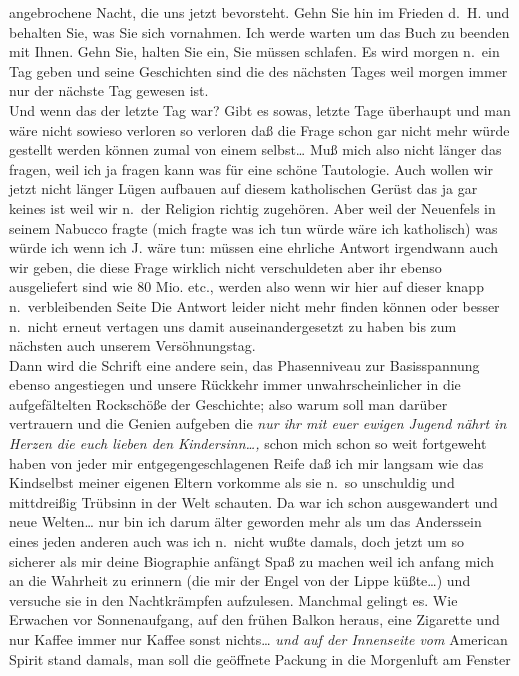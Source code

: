 \documentclass[
]{article}
\begin{document}
angebrochene Nacht, die uns jetzt bevorsteht. Gehn Sie hin im Frieden
d.~H. und behalten Sie, was Sie sich vornahmen. Ich werde warten um das
Buch zu beenden mit Ihnen. Gehn Sie, halten Sie ein, Sie müssen
schlafen. Es wird morgen n.~ein Tag geben und seine Geschichten sind die
des nächsten Tages weil morgen immer nur der nächste Tag gewesen ist.\\
Und wenn das der letzte Tag war? Gibt es sowas, letzte Tage überhaupt
und man wäre nicht sowieso verloren so verloren daß die Frage schon gar
nicht mehr würde gestellt werden können zumal von einem selbst\ldots{}
Muß mich also nicht länger das fragen, weil ich ja fragen kann was für
eine schöne Tautologie. Auch wollen wir jetzt nicht länger Lügen
aufbauen auf diesem katholischen Gerüst das ja gar keines ist weil wir
n.~der Religion richtig zugehören. Aber weil der Neuenfels in seinem
Nabucco fragte (mich fragte was ich tun würde wäre ich katholisch) was
würde ich wenn ich J. wäre tun: müssen eine ehrliche Antwort irgendwann
auch wir geben, die diese Frage wirklich nicht verschuldeten aber ihr
ebenso ausgeliefert sind wie 80 Mio. etc., werden also wenn wir hier auf
dieser knapp n.~verbleibenden Seite Die Antwort leider nicht mehr finden
können oder besser n.~nicht erneut vertagen uns damit auseinandergesetzt
zu haben bis zum nächsten auch unserem Versöhnungstag.\\
Dann wird die Schrift eine andere sein, das Phasenniveau zur
Basisspannung ebenso angestiegen und unsere Rückkehr immer
unwahrscheinlicher in die aufgefältelten Rockschöße der Geschichte; also
warum soll man darüber vertrauern und die Genien aufgeben die \emph{nur
ihr mit euer ewigen Jugend nährt in Herzen die euch lieben den
Kindersinn\ldots,} schon mich schon so weit fortgeweht haben von jeder
mir entgegengeschlagenen Reife daß ich mir langsam wie das Kindselbst
meiner eigenen Eltern vorkomme als sie n.~so unschuldig und mittdreißig
Trübsinn in der Welt schauten. Da war ich schon ausgewandert und neue
Welten\ldots{} nur bin ich darum älter geworden mehr als um das
Anderssein eines jeden anderen auch was ich n.~nicht wußte damals, doch
jetzt um so sicherer als mir deine Biographie anfängt Spaß zu machen
weil ich anfang mich an die Wahrheit zu erinnern (die mir der Engel von
der Lippe küßte\ldots) und versuche sie in den Nachtkrämpfen aufzulesen.
Manchmal gelingt es. Wie Erwachen vor Sonnenaufgang, auf den frühen
Balkon heraus, eine Zigarette und nur Kaffee immer nur Kaffee sonst
nichts\ldots{} \emph{und auf der Innenseite vom }American Spirit stand
damals, man soll die geöffnete Packung in die Morgenluft am Fenster
\end{document}
